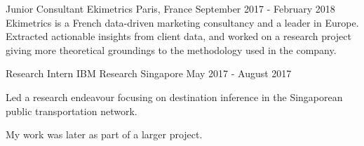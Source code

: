 \begin{cventries}
    \cventry
    {Junior Consultant} %
    {Ekimetrics} %
    {Paris, France} %
    {September 2017 - February 2018} %
    {
        Ekimetrics is a French data-driven marketing consultancy and a leader in Europe. Extracted actionable insights from client data, and worked on a research project giving more theoretical groundings to the methodology used in the company.
    }

    \cventry
    {Research Intern} %
    {IBM Research} %
    {Singapore} %
    {May 2017 - August 2017} %
    {
        \begin{cvitems} %
            \item Led a research endeavour focusing on destination inference in the Singaporean public transportation network.
            \item My work was later  as part of a larger project.
        \end{cvitems}
    }
\end{cventries}

